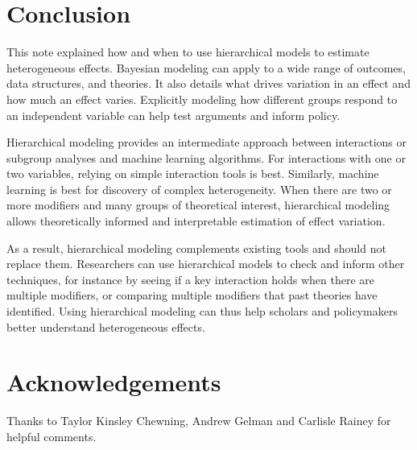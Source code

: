 \documentclass[12pt]{article}
\begin{document}
\section{Conclusion}


This note explained how and when to use hierarchical models to estimate heterogeneous effects. 
Bayesian modeling can apply to a wide range of outcomes, data structures, and theories. 
It also details what drives variation in an effect and how much an effect varies. 
Explicitly modeling how different groups respond to an independent variable can help test arguments and inform policy.  


Hierarchical modeling provides an intermediate approach between interactions or subgroup analyses and machine learning algorithms. 
For interactions with one or two variables, relying on simple interaction tools is best. 
Similarly, machine learning is best for discovery of complex heterogeneity.
When there are two or more modifiers and many groups of theoretical interest, hierarchical modeling allows theoretically informed and interpretable estimation of effect variation. 

As a result, hierarchical modeling complements existing tools and should not replace them. 
Researchers can use hierarchical models to check and inform other techniques, for instance by seeing if a key interaction holds when there are multiple modifiers, or comparing multiple modifiers that past theories have identified. 
Using hierarchical modeling can thus help scholars and policymakers better understand heterogeneous effects.


\section*{Acknowledgements}

Thanks to Taylor Kinsley Chewning, Andrew Gelman and Carlisle Rainey for helpful comments.

\singlespace
 


%
\end{document}
